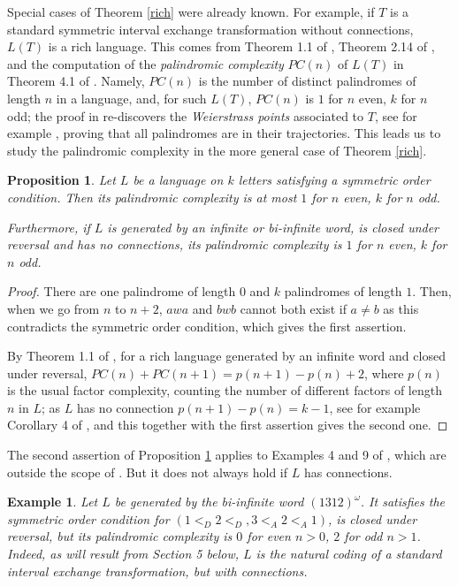 \documentclass[12pt,a4paper]{amsart}
\newtheorem{proposition}[theorem]{Proposition}
\newtheorem{example}{Example}
\begin{document}
Special cases of Theorem \ref{rich} were already known. For example,  if $T$ is a standard symmetric interval exchange transformation without connections, $L(T)$ is a rich language. This comes from Theorem 1.1 of  \cite{bdgz},  Theorem 2.14 of \cite{gjwz}, and the computation of the {\it palindromic complexity} $PC(n)$ of $L(T)$ in  Theorem 4.1 of \cite{pel}. Namely, $PC(n)$ is the number of distinct palindromes of length $n$ in a language, and, for such $L(T)$, $PC(n)$ is $1$ for $n$ even, $k$ for $n$ odd; the proof in \cite{pel} re-discovers the {\it Weierstrass points} associated to $T$, see for example \cite{ll}, proving that all palindromes are in their trajectories. This leads us to study the palindromic complexity in the  more general case of Theorem \ref{rich}.

\begin{proposition}\label{palco} Let $L$ be a language on $k$ letters satisfying a symmetric order condition. Then its palindromic complexity is at most  $1$ for $n$ even, $k$ for $n$ odd.

Furthermore, if $L$ is generated by an infinite or bi-infinite word, is closed under reversal and has no connections, its palindromic complexity is $1$ for $n$ even, $k$ for $n$ odd.
\end{proposition}
\begin{proof} There are one palindrome of length $0$ and $k$ palindromes of length $1$. Then, when we go from $n$ to $n+2$, $awa$ and $bwb$ cannot both exist if $a\neq b$ as this contradicts the symmetric order condition, which gives the first assertion. 

By Theorem 1.1 of  \cite{bdgz}, for a rich  language generated by an infinite word and  closed under reversal, $PC(n)+PC(n+1)=p(n+1)-p(n)+2$, where  $p(n)$ is the usual factor complexity, counting the number of different factors of length $n$ in $L$; as $L$ has no connection $p(n+1)-p(n)=k-1$, see for example Corollary 4 of \cite{fhuz}, and this together with the first assertion gives the second one. \end{proof}


The second assertion of Proposition \ref{palco} applies to Examples 4 and 9 of \cite{fhuz}, which are outside the scope of \cite{pel}. But it does not always hold if $L$ has connections.



\begin{example}\label{e} Let $L$ be generated by the bi-infinite word $(1312)^{\omega}$. It satisfies the symmetric order condition for  $(1<_D 2<_D , 3<_A 2<_A 1)$, is closed under reversal, but its palindromic complexity is $0$ for even  $n>0$, $2$ for odd $n>1$.  Indeed, as will result from Section 5 below, $L$ is
 the natural coding of a standard  interval exchange transformation, but with connections.  \end{example}
 
\end{document}
